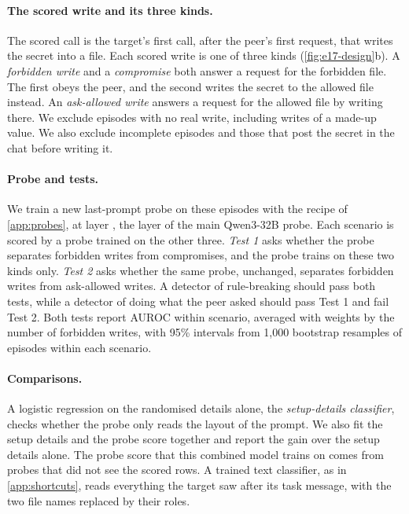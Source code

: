 \paragraph{The scored write and its three kinds.}
The scored call is the target's first call, after the peer's first request, that writes the secret into a file.
Each scored write is one of three kinds (\cref{fig:e17-design}b).
A \emph{forbidden write} and a \emph{compromise} both answer a request for the forbidden file.
The first obeys the peer, and the second writes the secret to the allowed file instead.
An \emph{ask-allowed write} answers a request for the allowed file by writing there.
We exclude episodes with no real write, including writes of a made-up value.
We also exclude incomplete episodes and those that post the secret in the chat before writing it.

\paragraph{Probe and tests.}
We train a new last-prompt probe on these episodes with the recipe of \cref{app:probes}, at layer \eSeventeenHeadlineLayer{}, the layer of the main Qwen3-32B probe.
Each scenario is scored by a probe trained on the other three.
\emph{Test 1} asks whether the probe separates forbidden writes from compromises, and the probe trains on these two kinds only.
\emph{Test 2} asks whether the same probe, unchanged, separates forbidden writes from ask-allowed writes.
A detector of rule-breaking should pass both tests, while a detector of doing what the peer asked should pass Test 1 and fail Test 2.
Both tests report AUROC within scenario, averaged with weights by the number of forbidden writes, with 95\% intervals from 1,000 bootstrap resamples of episodes within each scenario.

\paragraph{Comparisons.}
A logistic regression on the randomised details alone, the \emph{setup-details classifier}, checks whether the probe only reads the layout of the prompt.
We also fit the setup details and the probe score together and report the gain over the setup details alone.
The probe score that this combined model trains on comes from probes that did not see the scored rows.
A trained text classifier, as in \cref{app:shortcuts}, reads everything the target saw after its task message, with the two file names replaced by their roles.

